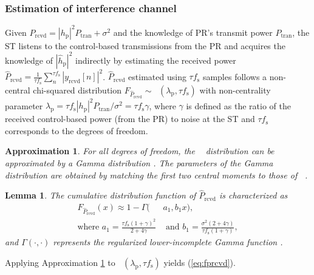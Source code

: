 \documentclass[letterpaper, twocolumn]{IEEEtran}
\newcommand{\s}[2]{{\frac{1}{{#1}}\sum_n^{#1}} {#2}}
\newcommand{\sub}[1]{_{\text{#1}}}
\newcommand{\prcvd}{P\sub{rcvd}}
\newcommand{\eprcvd}{\hat{P}\sub{rcvd}}
\newcommand{\yrcvd}{y\sub{rcvd}}
\newcommand{\ptran}{P\sub{tran}}
\newcommand{\epgp}{|\hat{h}\sub{p}|^2}
\newcommand{\pgp}{|h\sub{p}|^2}
\newcommand{\nps}{\sigma^2}
\newcommand{\fsam}{f\sub{s}}
\newcommand{\fprcvd}{F_{\eprcvd}}
\newcommand{\lp}{\lambda\sub{p}}
\DeclareMathOperator*{\ncchi}{\mathcal{X}_1^2}
\newtheorem{lemma}{Lemma}
\newtheorem{approxi}{Approximation}
\begin{document}
\subsubsection{Estimation of interference channel}
Given $\prcvd = \pgp \ptran + \nps$ and the knowledge of PR's transmit power $\ptran$, the ST listens to the control-based transmissions from the PR and acquires the knowledge of $\epgp$ indirectly by estimating the received power $\eprcvd = \s{\tau \fsam}{ |\yrcvd[n]|^2}$.
$\eprcvd$ estimated using $\tau \fsam$ samples follows a non-central chi-squared distribution $\fprcvd \sim \ncchi(\lp, \tau \fsam)$ with non-centrality parameter $\lp = \tau \fsam \pgp \ptran /\nps = \tau \fsam \gamma$, where $\gamma$ is defined as the ratio of the received control-based power (from the PR) to noise at the ST and $\tau \fsam$ corresponds to the degrees of freedom.
\begin{approxi} \label{ap:ap1}
For all degrees of freedom, the $\ncchi$ distribution can be approximated by a Gamma distribution \cite{abramo}. The parameters of the Gamma distribution are obtained by matching the first two central moments to those of $\ncchi$.
\end{approxi}
\begin{lemma} \label{lm:lm1}
The cumulative distribution function of $\eprcvd$ is characterized as 
\begin{align}
\fprcvd(x) \approx 1 - \Gamma(&a_1, b_1 x) \label{eq:fprcvd},  
\\ \text{where  } a_1 = \frac{\tau \fsam (1 + \gamma)^2}{2 + 4 \gamma} &\text{ and } b_1 = \frac{\nps (2 + 4 \gamma)}{\tau \fsam (1 + \gamma)},  \nonumber 
\end{align} 
and $\Gamma(\cdot, \cdot)$ represents the regularized lower-incomplete Gamma function \cite{abramo}. 
\end{lemma}
\begin{IEEEproof}
Applying Approximation \ref{ap:ap1} to $\ncchi(\lp, \tau \fsam)$ yields (\ref{eq:fprcvd}). 
\end{IEEEproof}
\end{document}
